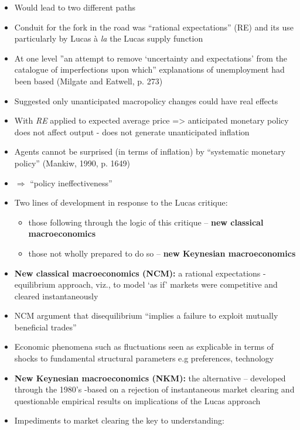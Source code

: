 \documentclass[a4paper,twoside]{article}
\numberwithin{equation}{section}
\numberwithin{figure}{section}
\begin{document}
\begin{itemize}
\begin{quote}
		\end{quote}
		\item Would lead to two different paths 
		\item Conduit for the fork in the road was ``rational expectations'' (RE) and its use particularly by Lucas à \textit{la} the Lucas supply function
		\item At one level ''an attempt to remove `uncertainty and expectations' from the catalogue of imperfections upon which'' explanations of unemployment had been based (Milgate and Eatwell, p. 273)
		\item Suggested only unanticipated macropolicy changes could have real effects
		\item With \textit{RE} applied to expected average price => anticipated monetary policy does not affect output - does not generate unanticipated inflation
		\item Agents cannot be surprised (in terms of inflation) by ``systematic monetary policy'' (Mankiw, 1990, p. 1649)
		\item  \( \Rightarrow \) ``policy ineffectiveness''
		\item Two lines of development in response to the Lucas critique: 
		\begin{itemize}
			\item those following through the logic of this critique -- \textbf{new classical macroeconomics}
			\item those not wholly prepared to do so -- \textbf{new Keynesian macroeconomics}
		\end{itemize}
		\item \textbf{New classical macroeconomics (NCM):} a rational expectations - equilibrium approach, viz., to model `as if' markets were competitive and cleared instantaneously
		\item NCM argument that disequilibrium ``implies a failure to exploit mutually beneficial trades''
		\item Economic phenomena such as fluctuations seen as explicable in terms of shocks to fundamental structural parameters e.g preferences, technology
		\item \textbf{New Keynesian macroeconomics (NKM):} the alternative -- developed through the 1980's -based on a rejection of instantaneous market clearing and questionable empirical results on  implications of the Lucas approach
		\item Impediments to market clearing the key to understanding:
		\begin{itemize}

\end{itemize}
\end{itemize}
\end{document}
